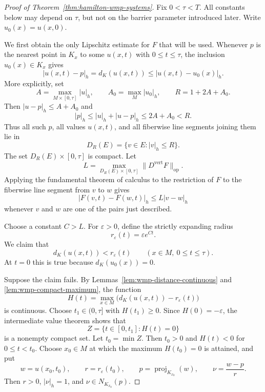 \documentclass[10pt]{coll-l}
\theoremstyle{definition}
\theoremstyle{remark}
\numberwithin{section}{chapter}
\numberwithin{equation}{chapter}
\begin{document}
\begin{proof}[Proof of Theorem~\ref{thm:hamilton-wmp-systems}]
Fix $0<\tau<T$.  All constants below may depend on $\tau$, but not on the
barrier parameter introduced later.  Write $u_0(x)=u(x,0)$.

We first obtain the only Lipschitz estimate for $F$ that will be used.
Whenever $p$ is the nearest point in $K_x$ to some $u(x,t)$ with
$0\leq t\leq\tau$, the inclusion $u_0(x)\in K_x$ gives
\[
|u(x,t)-p|_h=d_K(u(x,t))
       \leq |u(x,t)-u_0(x)|_h.
\]
More explicitly, set
\[
 A=\max_{M\times[0,\tau]}|u|_h,
 \qquad A_0=\max_M|u_0|_h,
 \qquad R=1+2A+A_0.
\]
Then $|u-p|_h\leq A+A_0$ and
\[
       |p|_h\leq |u|_h+|u-p|_h\leq2A+A_0<R.
\]
Thus all such $p$, all values $u(x,t)$, and all fiberwise line segments
joining them lie in
\[
       D_R(E)=\{v\in E:|v|_h\leq R\}.
\]
The set $D_R(E)\times[0,\tau]$ is compact.  Let
\[
 L=\max_{D_R(E)\times[0,\tau]}
      \bigl\|D^{\mathrm{vert}}F\bigr\|_{\mathrm{op}}.
\]
Applying the fundamental theorem of calculus to the restriction of $F$ to
the fiberwise line segment from $v$ to $w$ gives
\begin{equation}
   |F(v,t)-F(w,t)|_h\leq L|v-w|_h                         \label{eq:wmp-local-lipschitz}
\end{equation}
whenever $v$ and $w$ are one of the pairs just described.

Choose a constant $C>L$.  For $\varepsilon>0$, define the strictly expanding
radius
\[
       r_\varepsilon(t)=\varepsilon e^{Ct}.
\]
We claim that
\begin{equation}
       d_K(u(x,t))<r_\varepsilon(t)
       \qquad (x\in M,\ 0\leq t\leq\tau).                 \label{eq:wmp-tube-claim}
\end{equation}
At $t=0$ this is true because $d_K(u_0(x))=0$.

Suppose the claim fails.  By Lemmas~\ref{lem:wmp-distance-continuous} and
\ref{lem:wmp-compact-maximum}, the function
\[
       H(t)=\max_{x\in M}\bigl(d_K(u(x,t))-r_\varepsilon(t)\bigr)
\]
is continuous.  Choose $t_1\in(0,\tau]$ with $H(t_1)\geq0$.  Since
$H(0)=-\varepsilon$, the intermediate value theorem shows that
\[
 Z=\{t\in[0,t_1]:H(t)=0\}
\]
is a nonempty compact set.  Let $t_0=\min Z$.  Then $t_0>0$ and
$H(t)<0$ for $0\leq t<t_0$.  Choose $x_0\in M$ at which the maximum
$H(t_0)=0$ is attained, and put
\[
  w=u(x_0,t_0),\qquad
  r=r_\varepsilon(t_0),\qquad
  p=\operatorname{proj}_{K_{x_0}}(w),\qquad
  \nu=\frac{w-p}{r}.
\]
Then $r>0$, $|\nu|_h=1$, and $\nu\in N_{K_{x_0}}(p)$.


\end{proof}
\end{document}

